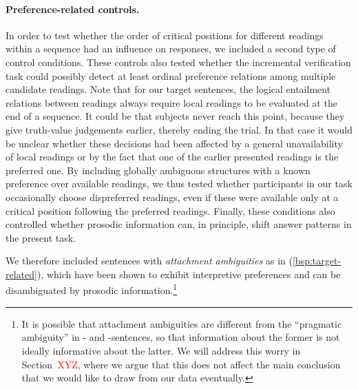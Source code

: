 \documentclass[fleqn,reqno,10pt]{article}
\newcommand{\as}{\acro{as}}
\renewcommand{\es}{\acro{es}}
\begin{document}
\paragraph{Preference-related controls.} In order to test whether the
order of critical positions for different readings within a sequence
had an influence on responses, we included a second type of control
conditions.  These controls also tested whether the incremental
verification task could possibly detect at least ordinal preference
relations among multiple candidate readings. Note that for our target
sentences, the logical entailment relations between readings always
require local readings to be evaluated at the end of a sequence. It
could be that subjects never reach this point, because they give
truth-value judgements earlier, thereby ending the trial. In that case
it would be unclear whether these decisions had been affected by a
general unavailability of local readings or by the fact that one of
the earlier presented readings is the preferred one. By including
globally ambiguous structures with a known preference over available
readings, we thus tested whether participants in our task occasionally
choose dispreferred readings, even if these were available only at a
critical position following the preferred readings. Finally, these
conditions also controlled whether prosodic information can, in
principle, shift answer patterns in the present task.

We therefore included sentences with \emph{attachment ambiguities} as
in (\ref{bsp:target-related}), which have been shown to exhibit
interpretive preferences and can be disambiguated by prosodic
information.\footnote{It is possible that attachment ambiguities are
  different from the ``pragmatic ambiguity'' in \as- and
  \es-sentences, so that information about the former is not ideally
  informative about the latter. We will address this worry in
  Section~\textcolor{red}{XYZ}, where we argue that this does not
  affect the main conclusion that we would like to draw from our data
  eventually.}
\end{document}
